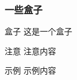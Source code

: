\documentclass{ctexbeamer}
\begin{document}
\begin{frame}
  \frametitle{一些盒子}
  \begin{block}{盒子}
    这是一个盒子
  \end{block}
  \begin{alertblock}{注意}
    注意内容
  \end{alertblock}
  \begin{exampleblock}{示例}
    示例内容
  \end{exampleblock}
\end{frame}
\end{document}
